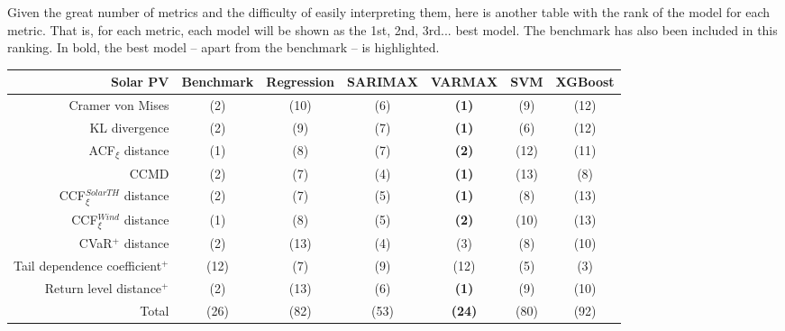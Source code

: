 Given the great number of metrics and the difficulty of easily interpreting them, here is another table with the rank of the model for each metric. That is, for each metric, each model will be shown as the 1st, 2nd, 3rd... best model. The benchmark has also been included in this ranking. In bold, the best model -- apart from the benchmark -- is highlighted. 
\newpage
\begin{table}[ht]
    \footnotesize
    \begin{tabular}[l]{r|c|ccc|cc|}
        \toprule
        \textbf{Solar PV} &Benchmark&Regression&SARIMAX&VARMAX&SVM&XGBoost \\
        \midrule            
        Cramer von Mises&(2)&(10)&(6)&\textbf{(1)}&(9)&(12) \\
        KL divergence&(2)&(9)&(7)&\textbf{(1)}&(6)&(12) \\
        ACF$_\xi$ distance&(1)&(8)&(7)&\textbf{(2)}&(12)&(11) \\
        \midrule
        CCMD&(2)&(7)&(4)&\textbf{(1)}&(13)&(8) \\
        CCF$_\xi^{Solar TH}$ distance&(2)&(7)&(5)&\textbf{(1)}&(8)&(13) \\
        CCF$_\xi^{Wind}$ distance&(1)&(8)&(5)&\textbf{(2)}&(10)&(13) \\
        \midrule
        CVaR$^+$ distance&(2)&(13)&(4)&(3)&(8)&(10) \\
        Tail dependence coefficient$^+$&(12)&(7)&(9)&(12)&(5)&(3) \\
        Return level distance$^+$&(2)&(13)&(6)&\textbf{(1)}&(9)&(10) \\
        \bottomrule
        Total&(26)&(82)&(53)&\textbf{(24)}&(80)&(92) \\
        \bottomrule
    \end{tabular}
\end{table}
